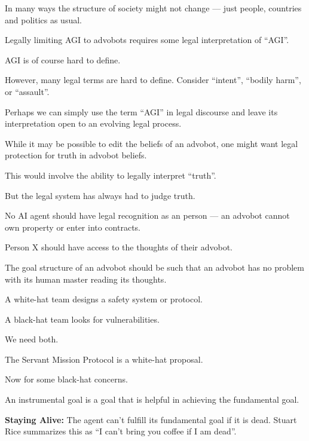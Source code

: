 {\vfill
In many ways the structure of society might not change --- just people, countries and politics as usual.


Legally limiting AGI to advobots requires some legal interpretation of ``AGI''.

\vfill
AGI is of course hard to define.

\vfill
However, many legal terms are hard to define.  Consider ``intent'', ``bodily harm'', or ``assault''.

\vfill
Perhaps we can simply use the term ``AGI'' in legal discourse and leave its interpretation open to an evolving legal process.


While it may be possible to edit the beliefs of an advobot, one might want legal protection for truth in advobot beliefs.

\vfill
This would involve the ability to legally interpret ``truth''.

\vfill
But the legal system has always had to judge truth.


No AI agent should have legal recognition as an person --- an advobot cannot own property or enter into contracts.

\vfill
Person X should have access to the thoughts of their advobot.

\vfill
The goal structure of an advobot should be such that an advobot has no problem
with its human master reading its thoughts.


A white-hat team designs a safety system or protocol.

\vfill
A black-hat team looks for vulnerabilities.

\vfill
We need both.

\vfill
The Servant Mission Protocol is a white-hat proposal.

\vfill
Now for some black-hat concerns.


An instrumental goal is a goal that is helpful in achieving the fundamental goal.

\vfill
{\bf Staying Alive:} The agent can't fulfill its fundamental goal if it is dead.  Stuart Rice summarizes this as ``I can't bring you coffee if I am dead''.

}
